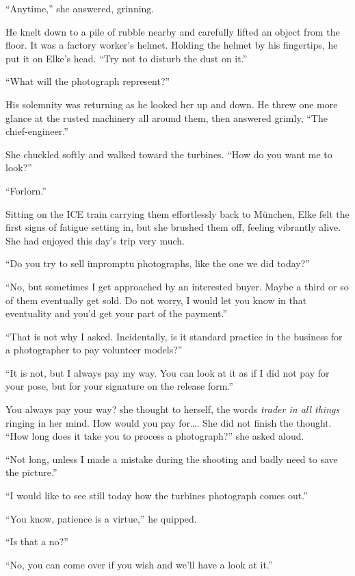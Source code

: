 ``Anytime,'' she answered, grinning.

He knelt down to a pile of rubble nearby and carefully lifted an object from the floor. It was a factory worker's helmet. Holding the helmet by his fingertips, he put it on Elke's head. ``Try not to disturb the dust on it.''

``What will the photograph represent?''

His solemnity was returning as he looked her up and down. He threw one more glance at the rusted machinery all around them, then answered grimly, ``The chief-engineer.''

She chuckled softly and walked toward the turbines. ``How do you want me to look?''

``Forlorn.''

\sectionline

Sitting on the ICE train carrying them effortlessly back to München, Elke felt the first signs of fatigue setting in, but she brushed them off, feeling vibrantly alive. She had enjoyed this day's trip very much.

``Do you try to sell impromptu photographs, like the one we did today?''

``No, but sometimes I get approached by an interested buyer. Maybe a third or so of them eventually get sold. Do not worry, I would let you know in that eventuality and you'd get your part of the payment.''

``That is not why I asked. Incidentally, is it standard practice in the business for a photographer to pay volunteer models?''

``It is not, but I always pay my way. You can look at it as if I did not pay for your pose, but for your signature on the release form.''

You always pay your way? she thought to herself, the words \emph{trader in all things} ringing in her mind. How would you pay for\ldots. She did not finish the thought. ``How long does it take you to process a photograph?'' she asked aloud.

``Not long, unless I made a mistake during the shooting and badly need to save the picture.''

``I would like to see still today how the turbines photograph comes out.''

``You know, patience is a virtue,'' he quipped.

``Is that a no?''

``No, you can come over if you wish and we'll have a look at it.''

